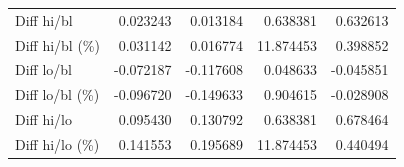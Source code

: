 \begin{table}
\begin{tabular}{lrrrr}
     & & & & \\
    \midrule
    Diff hi/bl & 0.023243 & 0.013184 & 0.638381 & 0.632613 \\
    Diff hi/bl (\%) & 0.031142 & 0.016774 & 11.874453 & 0.398852 \\
    \midrule
    Diff lo/bl & -0.072187 & -0.117608 & 0.048633 & -0.045851 \\
    Diff lo/bl (\%) & -0.096720 & -0.149633 & 0.904615 & -0.028908 \\
    \midrule
    Diff hi/lo & 0.095430 & 0.130792 & 0.638381 & 0.678464 \\
    Diff hi/lo (\%) & 0.141553 & 0.195689 & 11.874453 & 0.440494 \\
    \bottomrule
    \end{tabular}

    \quad
    

\end{table}
